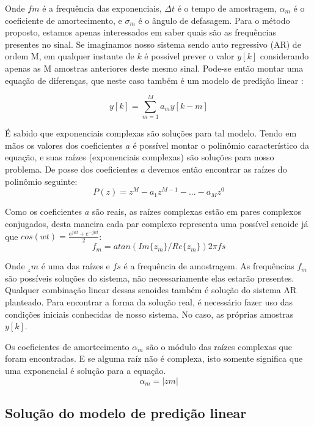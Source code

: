 \indent Onde $fm$ é a frequência das exponenciais, $\Delta t$ é o tempo de amostragem, $\alpha _m$ é o coeficiente de amortecimento, e $\sigma _m$ é o ângulo de defasagem. Para o método proposto, estamos apenas interessados em saber quais são as frequências presentes no sinal. Se imaginamos nosso sistema sendo auto regressivo (AR) de ordem M, em qualquer instante de $k$ é possível prever o valor $y[k]$ considerando apenas as M amostras anteriores deste mesmo sinal. Pode-se então montar uma equação de diferenças, que neste caso também é um modelo de predição linear \cite{huang2001spoken}:

\begin{equation}
y[k]=\sum_{m=1}^{M}a_m y[k-m]
\end{equation}

É sabido que exponenciais complexas são soluções para tal modelo. Tendo em mãos os valores dos coeficientes $a$ é possível montar o polinômio característico da equação, e suas raízes (exponenciais complexas) são soluções para nosso problema. De posse dos coeficientes $a$ devemos então encontrar as raízes do polinômio seguinte:
\begin{equation}
P(z)=z^M-a_1z^{M-1}-...-a_Mz^0
\end{equation}

\indent Como os coeficientes $a$  são reais, as raízes complexas estão em pares complexos conjugados, desta maneira cada par complexo representa uma possível senoide já que $cos(wt)=\frac{e^{jwt}+e^{-jwt}}{2}$:
\begin{equation}
f_m=atan(Im\{z_m\}/Re\{z_m\})2\pi fs
\end{equation}

\indent Onde $_zm$ é uma das raízes e $fs$ é a frequência de amostragem.
\indent As frequências $f_m$ são possíveis soluções do sistema, não necessariamente elas estarão presentes. Qualquer combinação linear dessas senoides também é solução do sistema AR planteado. Para encontrar a forma da solução real, é  necessário fazer uso das condições iniciais conhecidas de nosso sistema. No caso, as próprias amostras $y[k]$.

\indent Os coeficientes de amortecimento $\alpha_m$ são o módulo das raízes complexas que foram encontradas. E se alguma raíz não é complexa, isto somente significa que uma exponencial é solução para a equação.
\begin{equation}
\alpha_m=|zm|
\end{equation}
\subsection{Solução do modelo de predição linear}

